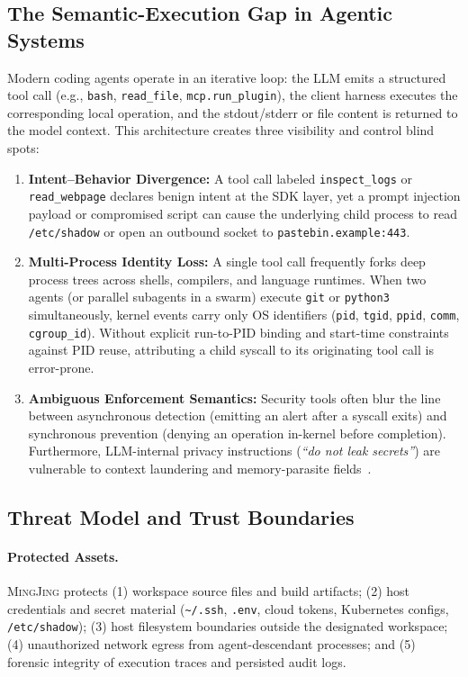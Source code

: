 \documentclass[10pt,twocolumn,letterpaper]{article}
\newcommand{\sys}{\textsc{MingJing}}
\newcommand{\code}[1]{\texttt{\small #1}}
\begin{document}
\subsection{The Semantic-Execution Gap in Agentic Systems}
Modern coding agents operate in an iterative loop: the LLM emits a structured tool call (e.g., \code{bash}, \code{read\_file}, \code{mcp.run\_plugin}), the client harness executes the corresponding local operation, and the stdout/stderr or file content is returned to the model context. This architecture creates three visibility and control blind spots:
\begin{enumerate}
  \item \textbf{Intent--Behavior Divergence:} A tool call labeled \code{inspect\_logs} or \code{read\_webpage} declares benign intent at the SDK layer, yet a prompt injection payload or compromised script can cause the underlying child process to read \code{/etc/shadow} or open an outbound socket to \code{pastebin.example:443}.
  \item \textbf{Multi-Process Identity Loss:} A single tool call frequently forks deep process trees across shells, compilers, and language runtimes. When two agents (or parallel subagents in a swarm) execute \code{git} or \code{python3} simultaneously, kernel events carry only OS identifiers (\code{pid}, \code{tgid}, \code{ppid}, \code{comm}, \code{cgroup\_id}). Without explicit run-to-PID binding and start-time constraints against PID reuse, attributing a child syscall to its originating tool call is error-prone.
  \item \textbf{Ambiguous Enforcement Semantics:} Security tools often blur the line between asynchronous detection (emitting an alert after a syscall exits) and synchronous prevention (denying an operation in-kernel before completion). Furthermore, LLM-internal privacy instructions (\emph{``do not leak secrets''}) are vulnerable to context laundering and memory-parasite fields~\cite{flowseal2026,sope2026}.
\end{enumerate}

\subsection{Threat Model and Trust Boundaries}
\paragraph{Protected Assets.} \sys{} protects (1) workspace source files and build artifacts; (2) host credentials and secret material (\code{\textasciitilde/.ssh}, \code{.env}, cloud tokens, Kubernetes configs, \code{/etc/shadow}); (3) host filesystem boundaries outside the designated workspace; (4) unauthorized network egress from agent-descendant processes; and (5) forensic integrity of execution traces and persisted audit logs.
\end{document}
